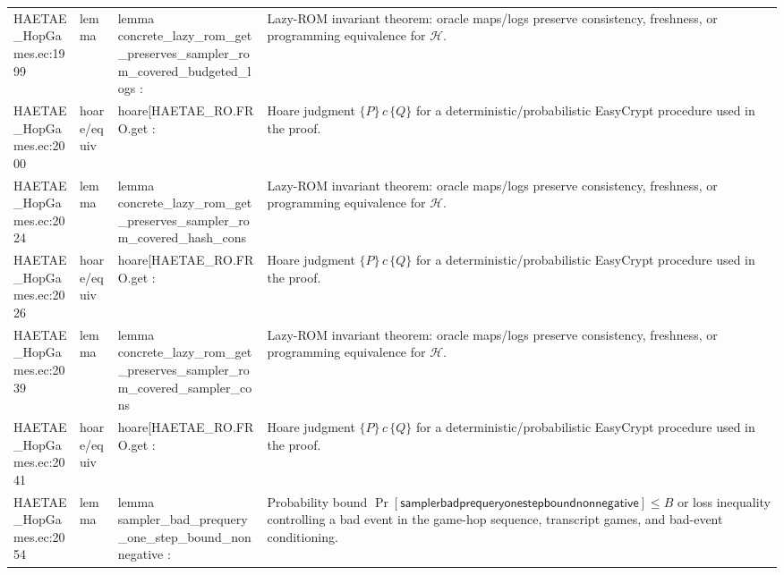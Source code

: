 \documentclass[10pt]{article}
\begin{document}
\begin{longtable}{L{0.11\textwidth}L{0.055\textwidth}L{0.385\textwidth}L{0.41\textwidth}}
HAETAE\_\allowbreak{}HopGames.\allowbreak{}ec:\allowbreak{}1999 & lemma & {\ttfamily\scriptsize lemma concrete\_\allowbreak{}lazy\_\allowbreak{}rom\_\allowbreak{}get\_\allowbreak{}preserves\_\allowbreak{}sampler\_\allowbreak{}rom\_\allowbreak{}covered\_\allowbreak{}budgeted\_\allowbreak{}logs :} & Lazy-ROM invariant theorem: oracle maps/logs preserve consistency, freshness, or programming equivalence for $\mathcal H$. \\
HAETAE\_\allowbreak{}HopGames.\allowbreak{}ec:\allowbreak{}2000 & hoare/equiv & {\ttfamily\scriptsize hoare[HAETAE\_\allowbreak{}RO.FRO.get :} & Hoare judgment $\{P\}\,c\,\{Q\}$ for a deterministic/probabilistic EasyCrypt procedure used in the proof. \\
HAETAE\_\allowbreak{}HopGames.\allowbreak{}ec:\allowbreak{}2024 & lemma & {\ttfamily\scriptsize lemma concrete\_\allowbreak{}lazy\_\allowbreak{}rom\_\allowbreak{}get\_\allowbreak{}preserves\_\allowbreak{}sampler\_\allowbreak{}rom\_\allowbreak{}covered\_\allowbreak{}hash\_\allowbreak{}cons} & Lazy-ROM invariant theorem: oracle maps/logs preserve consistency, freshness, or programming equivalence for $\mathcal H$. \\
HAETAE\_\allowbreak{}HopGames.\allowbreak{}ec:\allowbreak{}2026 & hoare/equiv & {\ttfamily\scriptsize hoare[HAETAE\_\allowbreak{}RO.FRO.get :} & Hoare judgment $\{P\}\,c\,\{Q\}$ for a deterministic/probabilistic EasyCrypt procedure used in the proof. \\
HAETAE\_\allowbreak{}HopGames.\allowbreak{}ec:\allowbreak{}2039 & lemma & {\ttfamily\scriptsize lemma concrete\_\allowbreak{}lazy\_\allowbreak{}rom\_\allowbreak{}get\_\allowbreak{}preserves\_\allowbreak{}sampler\_\allowbreak{}rom\_\allowbreak{}covered\_\allowbreak{}sampler\_\allowbreak{}cons} & Lazy-ROM invariant theorem: oracle maps/logs preserve consistency, freshness, or programming equivalence for $\mathcal H$. \\
HAETAE\_\allowbreak{}HopGames.\allowbreak{}ec:\allowbreak{}2041 & hoare/equiv & {\ttfamily\scriptsize hoare[HAETAE\_\allowbreak{}RO.FRO.get :} & Hoare judgment $\{P\}\,c\,\{Q\}$ for a deterministic/probabilistic EasyCrypt procedure used in the proof. \\
HAETAE\_\allowbreak{}HopGames.\allowbreak{}ec:\allowbreak{}2054 & lemma & {\ttfamily\scriptsize lemma sampler\_\allowbreak{}bad\_\allowbreak{}prequery\_\allowbreak{}one\_\allowbreak{}step\_\allowbreak{}bound\_\allowbreak{}nonnegative :} & Probability bound $\Pr[\mathsf{samplerbadprequeryonestepboundnonnegative}]\le B$ or loss inequality controlling a bad event in the game-hop sequence, transcript games, and bad-event conditioning. \\

\end{longtable}
\end{document}
